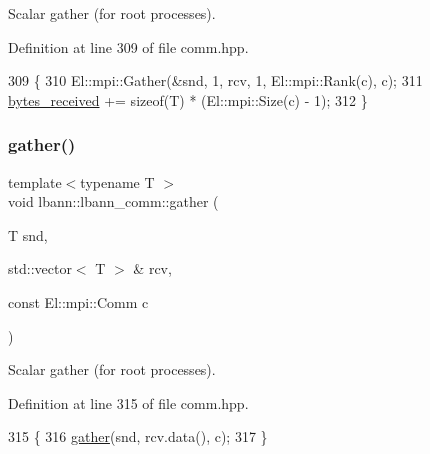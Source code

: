 Scalar gather (for root processes). 

Definition at line 309 of file comm.\+hpp.


\begin{DoxyCode}
309                                                 \{
310     El::mpi::Gather(&snd, 1, rcv, 1, El::mpi::Rank(c), c);
311     \hyperlink{classlbann_1_1lbann__comm_afb99f57f7eafc0695bf28e6c26a8120f}{bytes\_received} += \textcolor{keyword}{sizeof}(T) * (El::mpi::Size(c) - 1);
312   \}
\end{DoxyCode}
\mbox{\label{classlbann_1_1lbann__comm_a46a70202481a0b8bc5770f7174d8462f}} 
\subsubsection{\texorpdfstring{gather()}{gather()}\hspace{0.1cm}{\footnotesize\ttfamily [3/5]}}
{\footnotesize\ttfamily template$<$typename T $>$ \\
void lbann\+::lbann\+\_\+comm\+::gather (\begin{DoxyParamCaption}\item[{T}]{snd,  }\item[{std\+::vector$<$ T $>$ \&}]{rcv,  }\item[{const El\+::mpi\+::\+Comm}]{c }\end{DoxyParamCaption})\hspace{0.3cm}{\ttfamily [inline]}}

Scalar gather (for root processes). 

Definition at line 315 of file comm.\+hpp.


\begin{DoxyCode}
315                                                            \{
316     \hyperlink{classlbann_1_1lbann__comm_aa784298e6ed0f9f01a20b179d5110df9}{gather}(snd, rcv.data(), c);
317   \}
\end{DoxyCode}
\mbox{\label{classlbann_1_1lbann__comm_a6d9e9a16e30045690ea416bf25b77148}} 
